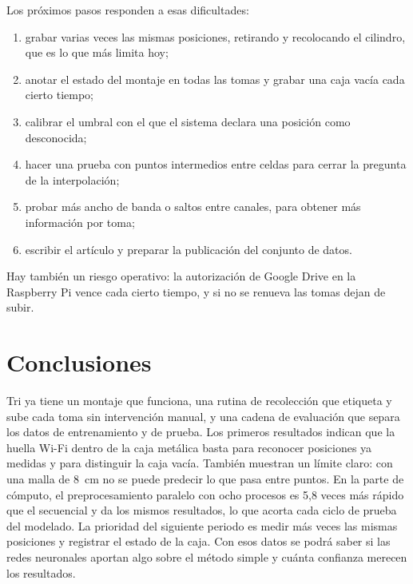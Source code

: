 \documentclass[10pt,journal]{IEEEtran}
\begin{document}
Los próximos pasos responden a esas dificultades:
\begin{enumerate}
    \item grabar varias veces las mismas posiciones, retirando y recolocando el cilindro, que es lo que más limita hoy;
    \item anotar el estado del montaje en todas las tomas y grabar una caja vacía cada cierto tiempo;
    \item calibrar el umbral con el que el sistema declara una posición como desconocida;
    \item hacer una prueba con puntos intermedios entre celdas para cerrar la pregunta de la interpolación;
    \item probar más ancho de banda o saltos entre canales, para obtener más información por toma;
    \item escribir el artículo y preparar la publicación del conjunto de datos.
\end{enumerate}

Hay también un riesgo operativo: la autorización de Google Drive en la Raspberry Pi vence cada cierto tiempo, y si no se renueva las tomas dejan de subir.

\section{Conclusiones}\label{sec:conclusiones}
Tri ya tiene un montaje que funciona, una rutina de recolección que etiqueta y sube cada toma sin intervención manual, y una cadena de evaluación que separa los datos de entrenamiento y de prueba. Los primeros resultados indican que la huella Wi-Fi dentro de la caja metálica basta para reconocer posiciones ya medidas y para distinguir la caja vacía. También muestran un límite claro: con una malla de 8~cm no se puede predecir lo que pasa entre puntos. En la parte de cómputo, el preprocesamiento paralelo con ocho procesos es 5,8 veces más rápido que el secuencial y da los mismos resultados, lo que acorta cada ciclo de prueba del modelado. La prioridad del siguiente periodo es medir más veces las mismas posiciones y registrar el estado de la caja. Con esos datos se podrá saber si las redes neuronales aportan algo sobre el método simple y cuánta confianza merecen los resultados.



\end{document}
